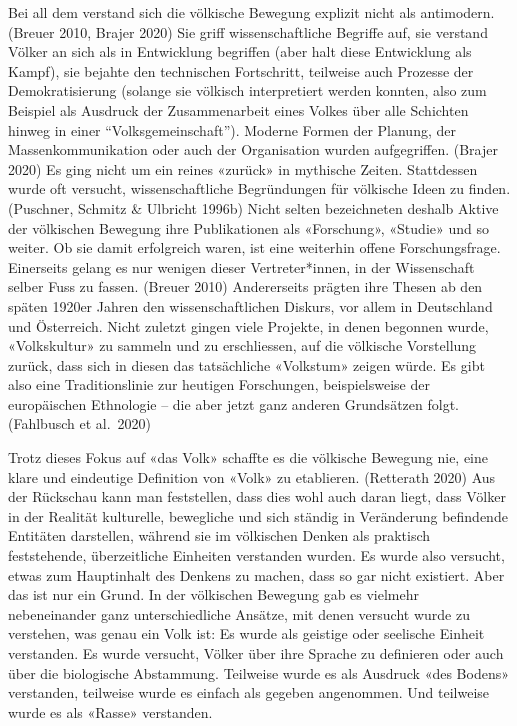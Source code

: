 \documentclass[a4paper,
fontsize=11pt,
oneside,
numbers=noperiodatend,
parskip=half-,
bibliography=totoc,
final
]{scrartcl}
\begin{document}
Bei all dem verstand sich die völkische Bewegung explizit nicht als
antimodern. (Breuer 2010, Brajer 2020) Sie griff wissenschaftliche
Begriffe auf, sie verstand Völker an sich als in Entwicklung begriffen
(aber halt diese Entwicklung als Kampf), sie bejahte den technischen
Fortschritt, teilweise auch Prozesse der Demokratisierung (solange sie
völkisch interpretiert werden konnten, also zum Beispiel als Ausdruck
der Zusammenarbeit eines Volkes über alle Schichten hinweg in einer
\enquote{Volksgemeinschaft}). Moderne Formen der Planung, der
Massenkommunikation oder auch der Organisation wurden aufgegriffen.
(Brajer 2020) Es ging nicht um ein reines «zurück» in mythische Zeiten.
Stattdessen wurde oft versucht, wissenschaftliche Begründungen für
völkische Ideen zu finden. (Puschner, Schmitz \& Ulbricht 1996b) Nicht
selten bezeichneten deshalb Aktive der völkischen Bewegung ihre
Publikationen als «Forschung», «Studie» und so weiter. Ob sie damit
erfolgreich waren, ist eine weiterhin offene Forschungsfrage. Einerseits
gelang es nur wenigen dieser Vertreter*innen, in der Wissenschaft selber
Fuss zu fassen. (Breuer 2010) Andererseits prägten ihre Thesen ab den
späten 1920er Jahren den wissenschaftlichen Diskurs, vor allem in
Deutschland und Österreich. Nicht zuletzt gingen viele Projekte, in
denen begonnen wurde, «Volkskultur» zu sammeln und zu erschliessen, auf
die völkische Vorstellung zurück, dass sich in diesen das tatsächliche
«Volkstum» zeigen würde. Es gibt also eine Traditionslinie zur heutigen
Forschungen, beispielsweise der europäischen Ethnologie -- die aber
jetzt ganz anderen Grundsätzen folgt. (Fahlbusch et al.~2020)

Trotz dieses Fokus auf «das Volk» schaffte es die völkische Bewegung
nie, eine klare und eindeutige Definition von «Volk» zu etablieren.
(Retterath 2020) Aus der Rückschau kann man feststellen, dass dies wohl
auch daran liegt, dass Völker in der Realität kulturelle, bewegliche und
sich ständig in Veränderung befindende Entitäten darstellen, während sie
im völkischen Denken als praktisch feststehende, überzeitliche Einheiten
verstanden wurden. Es wurde also versucht, etwas zum Hauptinhalt des
Denkens zu machen, dass so gar nicht existiert. Aber das ist nur ein
Grund. In der völkischen Bewegung gab es vielmehr nebeneinander ganz
unterschiedliche Ansätze, mit denen versucht wurde zu verstehen, was
genau ein Volk ist: Es wurde als geistige oder seelische Einheit
verstanden. Es wurde versucht, Völker über ihre Sprache zu definieren
oder auch über die biologische Abstammung. Teilweise wurde es als
Ausdruck «des Bodens» verstanden, teilweise wurde es einfach als gegeben
angenommen. Und teilweise wurde es als «Rasse» verstanden.
\end{document}
